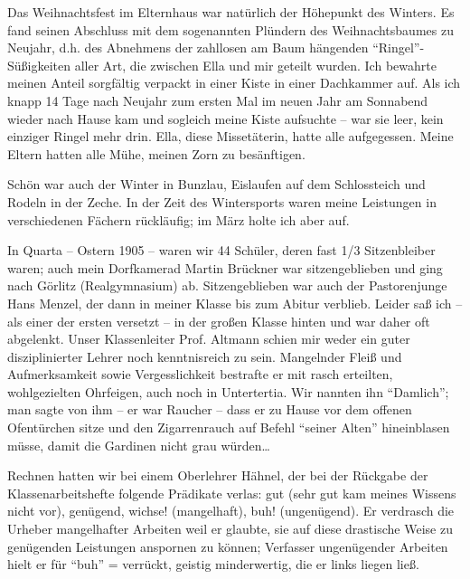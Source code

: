 Das Weihnachtsfest im Elternhaus war natürlich der Höhepunkt des Winters. Es fand seinen Abschluss mit dem sogenannten Plündern des Weihnachtsbaumes zu Neujahr, d.h. des Abnehmens der zahllosen am Baum hängenden \enquote{Ringel}-Süßigkeiten aller Art, die zwischen Ella und mir geteilt wurden. Ich bewahrte meinen Anteil sorgfältig verpackt in einer Kiste in einer Dachkammer auf. Als ich knapp 14 Tage nach Neujahr zum ersten Mal im neuen Jahr am Sonnabend wieder nach Hause kam und sogleich meine Kiste aufsuchte -- war sie leer, kein einziger Ringel mehr drin. Ella, diese Missetäterin, hatte alle aufgegessen. Meine Eltern hatten alle Mühe, meinen Zorn zu besänftigen.

Schön war auch der Winter in Bunzlau, Eislaufen auf dem Schlossteich und Rodeln in der Zeche. In der Zeit des Wintersports waren meine Leistungen in verschiedenen Fächern rückläufig; im März holte ich aber auf.

In Quarta -- Ostern 1905 -- waren wir 44 Schüler, deren fast 1/3 Sitzenbleiber waren; auch mein Dorfkamerad Martin Brückner war sitzengeblieben und ging nach Görlitz (Realgymnasium) ab. Sitzengeblieben war auch der Pastorenjunge Hans Menzel, der dann in meiner Klasse bis zum Abitur verblieb. Leider saß ich -- als einer der ersten versetzt -- in der großen Klasse hinten und war daher oft abgelenkt. Unser Klassenleiter Prof. Altmann schien mir weder ein guter disziplinierter Lehrer noch kenntnisreich zu sein. Mangelnder Fleiß und Aufmerksamkeit sowie Vergesslichkeit bestrafte er mit rasch erteilten, wohlgezielten Ohrfeigen, auch noch in Untertertia.  Wir nannten ihn \enquote{Damlich}; man sagte von ihm -- er war Raucher -- dass er zu Hause vor dem offenen Ofentürchen sitze und den Zigarrenrauch auf Befehl \enquote{seiner Alten} hineinblasen müsse, damit die Gardinen nicht grau würden\dots

Rechnen hatten wir bei einem Oberlehrer Hähnel, der bei der Rückgabe der Klassenarbeitshefte folgende Prädikate verlas: gut (sehr gut kam meines Wissens nicht vor), genügend, wichse! (mangelhaft), buh! (ungenügend). Er verdrasch die Urheber mangelhafter Arbeiten weil er glaubte, sie auf diese drastische Weise zu genügenden Leistungen anspornen zu können; Verfasser ungenügender Arbeiten hielt er für \enquote{buh} = verrückt, geistig minderwertig, die er links liegen ließ.

